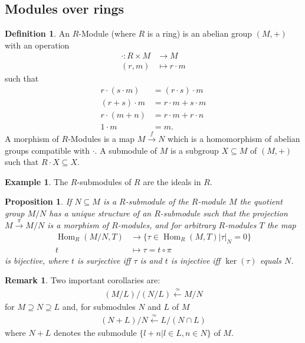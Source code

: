 \documentclass[DIV=14,parskip=half]{scrartcl}
\newtheorem{prop}{Proposition}[subsection]
\theoremstyle{definition}
\newtheorem{defi}{Definition}[subsection]
\newtheorem{example}{Example}[subsection]
\newtheorem{rem}{Remark}[subsection]
\newcommand{\Hom}{\operatorname{Hom}}
\newcommand{\longto}{\longrightarrow}
\newcommand{\longot}{\longleftarrow}
\begin{document}
\subsection{Modules over rings}
\begin{defi}\label{def:module}
 An $R$-Module (where $R$ is a ring) is an abelian group $(M,+)$ with an operation
 \begin{align*}
  \cdot: R\times M &\longto M\\
  (r,m) &\longmapsto r\cdot m
 \end{align*}
 such that
 \begin{align*}
  r\cdot(s\cdot m) &= (r\cdot s)\cdot m \\
  (r+s)\cdot m &= r\cdot m + s\cdot m\\
  r\cdot(m+n) &= r\cdot m +r\cdot n\\
  1\cdot m &= m.
 \end{align*}
A morphism of $R$-Modules is a map $M \overset{f}{\longto} N$ which is a homomorphism of abelian groups compatible with $\cdot$.
A submodule of $M$ is a subgroup $X\subseteq M$ of $(M,+)$ such that $R\cdot X \subseteq X$. 
\end{defi}
\begin{example} The $R$-submodules of $R$ are the ideals in $R$.
\end{example}
\begin{prop} If $N\subseteq M$ is a $R$-submodule of the $R$-module $M$ the quotient group $M/N$ has a unique structure of an $R$-submodule such that the projection $M\overset{\pi}{\longto} M/N$ is a morphism of $R$-modules, and for arbitrary $R$-modules $T$ the map  
\begin{align*}
 \Hom_R(M/N, T) &\longto \{\tau\in \Hom_R(M,T)| \tau|_N = 0\}\\
 t &\longmapsto \tau = t \circ \pi
\end{align*}
is bijective, where $t$ is surjective iff $\tau$ is and $t$ is injective iff $\ker(\tau)$ equals $N$.
\end{prop}
\begin{rem}
 Two important corollaries are:
 \begin{align*}
  (M/L)/(N/L) \overset{\simeq}{\longleftarrow} M/N
 \end{align*}
for $M\supseteq N \supseteq L$ and, for submodules $N$ and $L$ of $M$
\begin{align*}
 (N+L)/N \overset{\simeq}{\longot} L/(N\cap L)
\end{align*}
where $N+L$ denotes the submodule $\{l+n|l\in L, n\in N\}$ of $M$.
\end{rem}
\end{document}
